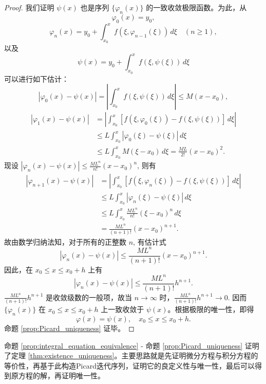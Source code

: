 \begin{proof}
    我们证明 $\psi(x)$ 也是序列 $\{\varphi_n(x)\}$ 的一致收敛极限函数。为此，从
$$\varphi_0(x) = y_0,$$
$$\varphi_n(x) = y_0 + \int_{x_0}^{x} f(\xi,\varphi_{n-1}(\xi))\,d\xi \quad (n \ge 1),$$
以及
$$\psi(x) = y_0 + \int_{x_0}^{x} f(\xi,\psi(\xi))\,d\xi$$
可以进行如下估计：
$$|\varphi_0(x)-\psi(x)| = \left|\int_{x_0}^{x} f(\xi,\psi(\xi))\,d\xi\right| \le M(x-x_0),$$
\begin{align*}
|\varphi_1(x)-\psi(x)| &= \left|\int_{x_0}^{x} [f(\xi,\varphi_0(\xi))-f(\xi,\psi(\xi))]\,d\xi\right| \\
&\le L \int_{x_0}^{x} |\varphi_0(\xi)-\psi(\xi)|\,d\xi \\
&\le L \int_{x_0}^{x} M(\xi-x_0)\,d\xi = \frac{ML}{2!}(x-x_0)^2.
\end{align*}
现设 $|\varphi_n(x)-\psi(x)| \le \frac{ML^n}{n!}(x-x_0)^n$, 则有
\begin{align*}
|\varphi_{n+1}(x)-\psi(x)| &= \left|\int_{x_0}^{x} [f(\xi,\varphi_n(\xi))-f(\xi,\psi(\xi))]\,d\xi\right| \\
&\le L \int_{x_0}^{x} |\varphi_n(\xi)-\psi(\xi)|\,d\xi \\
&\le L \int_{x_0}^{x} \frac{ML^n}{n!}(\xi-x_0)^n\,d\xi \\
&= \frac{ML^n}{(n+1)!}(x-x_0)^{n+1}.
\end{align*}
故由数学归纳法知，对于所有的正整数 $n$, 有估计式
\begin{equation}
|\varphi_n(x)-\psi(x)| \le \frac{ML^n}{(n+1)!}(x-x_0)^{n+1}. \label{eq:phi_n_psi_diff_x}
\end{equation}
因此，在 $x_0 \le x \le x_0+h$ 上有
\begin{equation}
|\varphi_n(x)-\psi(x)| \le \frac{ML^n}{(n+1)!}h^{n+1}. \label{eq:phi_n_psi_diff_h}
\end{equation}
$\frac{ML^n}{(n+1)!}h^{n+1}$ 是收敛级数的一般项，故当 $n \to \infty$ 时，$\frac{ML^n}{(n+1)!}h^{n+1} \to 0$. 因而 $\{\varphi_n(x)\}$ 在
$x_0 \le x \le x_0+h$ 上一致收敛于 $\psi(x)$。根据极限的唯一性，即得
$$\varphi(x) = \psi(x), \quad x_0 \le x \le x_0+h.$$
命题 \ref{prop:Picard_uniqueness} 证毕。
\end{proof}

\begin{remark}
    命题 \ref{prop:integral_equation_equivalence} - 命题 \ref{prop:Picard_uniqueness} 证明了定理 \ref{thm:existence_uniqueness}。主要思路就是先证明微分方程与积分方程的等价性，再基于此构造Picard迭代序列，证明它的良定义性与唯一性，最后可以得到原方程的解，再证明唯一性。
\end{remark}

